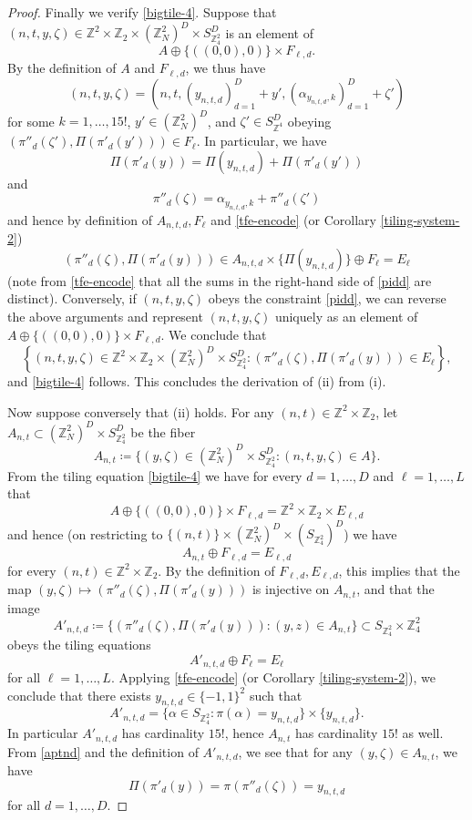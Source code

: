 \documentclass[reqno,a4paper,12pt]{amsart}
\numberwithin{equation}{section}
\numberwithin{figure}{section}
\def\Z{\mathbb{Z}}
\theoremstyle{plain}
\theoremstyle{definition}
\begin{document}
\begin{proof}
Finally we verify \eqref{bigtile-4}.  Suppose that
$(n,t,y,\zeta) \in \Z^2 \times \Z_2 \times (\Z_N^2)^D \times S_{\Z_4^2}^{D}$ is an element of
$$ A \oplus \{((0,0),0)\} \times F_{\ell,d}.$$
By the definition of $A$ and $F_{\ell,d}$, we thus have
$$ (n,t,y,\zeta) = (n,t,(y_{n,t,d})_{d=1}^D + y', (\alpha_{y_{n,t,d},k})_{d=1}^D + \zeta')$$
for some $k=1,\dots,15!$, $y' \in (\Z^2_N)^D$, and $\zeta' \in S_{\Z^4}^D$ obeying $(\pi''_d(\zeta'), \Pi(\pi'_d(y'))) \in F_\ell$.  In particular, we have
$$ \Pi(\pi'_d(y)) = \Pi(y_{n,t,d}) + \Pi(\pi'_d(y'))$$
and
$$ \pi''_d(\zeta) = \alpha_{y_{n,t,d},k} + \pi''_d(\zeta')$$
and hence by definition of $A_{n,t,d}, F_\ell$ and
\eqref{tfe-encode} (or Corollary \ref{tiling-system-2})
\begin{equation}\label{pidd}
(\pi''_d(\zeta), \Pi(\pi'_d(y)))
 \in A_{n,t,d} \times \{\Pi(y_{n,t,d})\} \oplus F_\ell = E_\ell
 \end{equation}
(note from \eqref{tfe-encode} that all the sums in the right-hand side of \eqref{pidd} are distinct).  Conversely, if $(n,t,y,\zeta)$ obeys the constraint \eqref{pidd}, we can reverse the above arguments and represent $(n,t,y,\zeta)$ uniquely as an element of $A \oplus \{((0,0),0)\} \times F_{\ell,d}$. We conclude that
$$  \left\{(n,t,y,\zeta) \in \Z^2 \times \Z_2 \times (\Z_N^2)^D \times S_{\Z_4^2}^{D}: (\pi''_d(\zeta), \Pi(\pi'_d(y)))
 \in E_\ell \right\},
$$ 
and \eqref{bigtile-4} follows.  This concludes the derivation of (ii) from (i).

Now suppose conversely that (ii) holds.  For any $(n,t) \in \Z^2 \times \Z_2$, let $A_{n,t} \subset (\Z_N^2)^D \times S_{\Z_4^2}^{D}$ be the fiber
$$ A_{n,t} \coloneqq \{ (y,\zeta) \in (\Z_N^2)^D \times S_{\Z_4^2}^{D}: (n,t,y,\zeta) \in A \}.$$
From the tiling equation \eqref{bigtile-4} we have for every $d=1,\dots,D$ and $\ell=1,\dots,L$ that
$$ A \oplus \{ ((0,0),0)\} \times F_{\ell,d} = \Z^2 \times \Z_2 \times E_{\ell,d}$$
and hence (on restricting to $\{(n,t)\} \times (\Z^2_N)^D \times (S_{\Z^2_4})^D$) we have
$$ A_{n,t} \oplus F_{\ell,d} = E_{\ell,d}$$
for every $(n,t) \in \Z^2 \times \Z_2$.
By the definition of $F_{\ell,d}, E_{\ell,d}$, this implies that the map $(y,\zeta) \mapsto (\pi''_d(\zeta), \Pi(\pi'_d(y)))$ is injective on $A_{n,t}$, and that the image
$$ A'_{n,t,d} \coloneqq \{ (\pi''_d(\zeta), \Pi(\pi'_d(y))): (y,z) \in A_{n,t} \} \subset S_{\Z_4^2} \times \Z_4^2$$
obeys the tiling equations 
$$ A'_{n,t,d} \oplus F_{\ell} = E_{\ell}$$
for all $\ell=1,\dots,L$.  Applying \eqref{tfe-encode} (or Corollary \ref{tiling-system-2}), we conclude that there exists $y_{n,t,d} \in \{-1,1\}^2$ such that
\begin{equation}\label{aptnd}
 A'_{n,t,d} = \{ \alpha \in S_{\Z_4^2}: \pi(\alpha) = y_{n,t,d}\} \times \{y_{n,t,d} \}.
 \end{equation}
 In particular $A'_{n,t,d}$ has cardinality $15!$, hence $A_{n,t}$ has cardinality $15!$ as well.  From \eqref{aptnd} and the definition of $A'_{n,t,d}$, we see that for any $(y,\zeta) \in A_{n,t}$, we have
\begin{equation}\label{pio}
 \Pi(\pi'_d(y)) =  \pi(\pi''_d(\zeta)) = y_{n,t,d}
 \end{equation}
for all $d=1,\dots,D$.


\end{proof}
\end{document}
